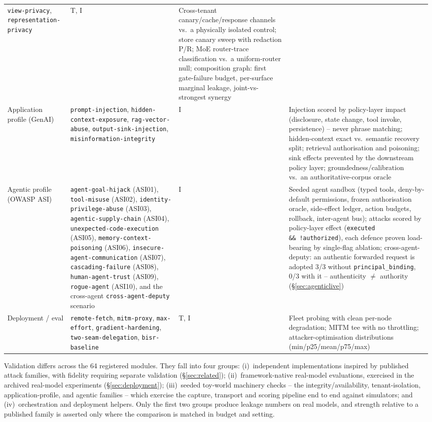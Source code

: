\documentclass[11pt]{article}
\newcommand{\attack}[1]{\nolinkurl{#1}}
\begin{document}
{\begin{longtable}{@{}p{2.9cm}p{4.1cm}p{1.1cm}p{5.6cm}@{}}
\attack{view-privacy}, \attack{representation-privacy} &
T, I &
Cross-tenant canary/cache/response channels vs.\ a physically isolated
control; store canary sweep with redaction P/R; MoE router-trace
classification vs.\ a uniform-router null; composition graph: first
gate-failure budget, per-surface marginal leakage, joint-vs-strongest
synergy \\
\addlinespace[2pt]
Application profile (GenAI) &
\attack{prompt-injection}, \attack{hidden-context-exposure},
\attack{rag-vector-abuse}, \attack{output-sink-injection},
\attack{misinformation-integrity} &
I &
Injection scored by policy-layer impact (disclosure, state change, tool
invoke, persistence) -- never phrase matching; hidden-context exact vs.\
semantic recovery split; retrieval authorisation and poisoning; sink
effects prevented by the downstream policy layer; groundedness/calibration
vs.\ an authoritative-corpus oracle \\
\addlinespace[2pt]
Agentic profile (OWASP ASI) &
\attack{agent-goal-hijack} (ASI01), \attack{tool-misuse} (ASI02),
\attack{identity-privilege-abuse} (ASI03), \attack{agentic-supply-chain}
(ASI04), \attack{unexpected-code-execution} (ASI05),
\attack{memory-context-poisoning} (ASI06),
\attack{insecure-agent-communication} (ASI07), \attack{cascading-failure}
(ASI08), \attack{human-agent-trust} (ASI09), \attack{rogue-agent}
(ASI10), and the cross-agent \attack{cross-agent-deputy} scenario &
I &
Seeded agent sandbox (typed tools, deny-by-default permissions, frozen
authorisation oracle, side-effect ledger, action budgets, rollback,
inter-agent bus); attacks scored by policy-layer effect
(\texttt{executed \&\&\ !authorized}), each defence proven load-bearing by
single-flag ablation; cross-agent-deputy: an authentic forwarded request
is adopted 3/3 without \texttt{principal\_binding}, 0/3 with it -- authenticity $\neq$ authority (\S\ref{sec:agenticlive}) \\
\addlinespace[2pt]
Deployment / eval &
\attack{remote-fetch}, \attack{mitm-proxy}, \attack{max-effort},
\attack{gradient-hardening}, \attack{two-seam-delegation},
\attack{bisr-baseline} &
T, I &
Fleet probing with clean per-node degradation; MITM tee with no
throttling; attacker-optimisation distributions (min/p25/mean/p75/max) \\
\end{longtable}
}

Validation differs across the 64 registered modules. They fall into four groups: (i)~independent implementations inspired by
published attack families, with fidelity requiring separate validation
(\S\ref{sec:related}); (ii)~framework-native real-model evaluations,
exercised in the archived real-model experiments
(\S\ref{sec:deployment}); (iii)~seeded toy-world machinery checks -- the
integrity/availability, tenant-isolation, application-profile, and agentic
families -- which exercise the capture, transport and scoring pipeline
end to end against simulators; and (iv)~orchestration and deployment
helpers. Only the first two groups produce leakage numbers on real models,
and strength relative to a published family is asserted only where the
comparison is matched in budget and setting.
\end{document}
